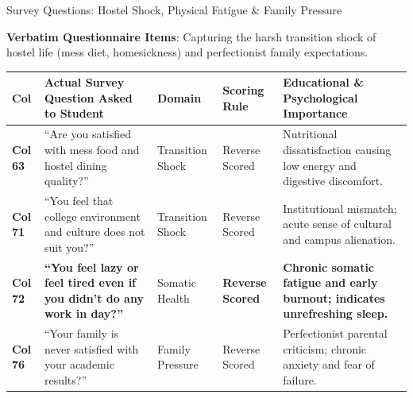 \documentclass{beamer}
\begin{document}
\begin{frame}[t]{Survey Questions: Hostel Shock, Physical Fatigue \& Family Pressure}
  \vspace{-0.20cm}
  \begin{topsummarybar}
    \fontsize{5.8pt}{7.0pt}\selectfont
    \textbf{\color{NavyDark}Verbatim Questionnaire Items}: Capturing the harsh transition shock of hostel life (mess diet, homesickness) and perfectionist family expectations.
  \end{topsummarybar}
  \vspace{-0.25cm}

  \begin{tcolorbox}[colback=white, colframe=BlueDeep, arc=1.2mm, boxrule=0.7pt, top=0.3mm, bottom=0.3mm, left=0.8mm, right=0.8mm]
    \fontsize{4.2pt}{5.0pt}\selectfont
    \renewcommand{\arraystretch}{0.55}
    \begin{tabularx}{\linewidth}{@{}p{0.7cm} p{4.2cm} p{1.6cm} p{1.6cm} X@{}}
      \toprule
      \rowcolor{NavyDark}
      \textbf{\color{white}Col} & \textbf{\color{white}Actual Survey Question Asked to Student} & \textbf{\color{white}Domain} & \textbf{\color{white}Scoring Rule} & \textbf{\color{white}Educational \& Psychological Importance} \\
      \midrule
      \rowcolor{BlueLight} \textbf{Col 63} & ``Are you satisfied with mess food and hostel dining quality?'' & Transition Shock & Reverse Scored & Nutritional dissatisfaction causing low energy and digestive discomfort. \\
      \rowcolor{CanvasBG} \textbf{Col 71} & ``You feel that college environment and culture does not suit you?'' & Transition Shock & Reverse Scored & Institutional mismatch; acute sense of cultural and campus alienation. \\
      \rowcolor{GoldBG} \textbf{Col 72} & \textbf{``You feel lazy or feel tired even if you didn't do any work in day?''} & Somatic Health & \textbf{Reverse Scored} & \textbf{Chronic somatic fatigue and early burnout; indicates unrefreshing sleep.} \\
      \midrule
      \rowcolor{BlueLight} \textbf{Col 76} & ``Your family is never satisfied with your academic results?'' & Family Pressure & Reverse Scored & Perfectionist parental criticism; chronic anxiety and fear of failure. \\

\end{tabularx}
\end{tcolorbox}
\end{frame}
\end{document}
